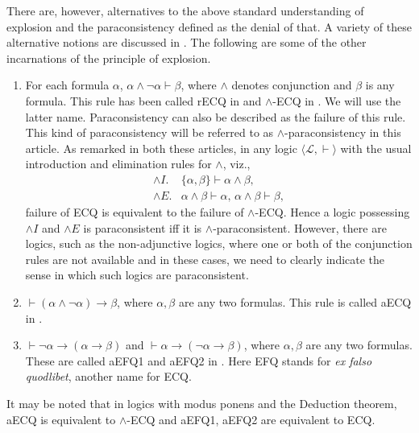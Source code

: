 \documentclass[submission]{eptcs}
\newcommand{\lang}{\mathcal{L}}
\newcommand{\limp}{\longrightarrow}
\theoremstyle{definition}
\begin{document}
There are, however, alternatives to the above standard understanding of explosion and the paraconsistency defined as the denial of that. A variety of these alternative notions are discussed in \cite{Robles2009}. The following are some of the other incarnations of the principle of explosion.
\begin{enumerate}
    \item For each formula $\alpha$, $\alpha\land\neg\alpha\vdash\beta$, where $\land$ denotes conjunction and $\beta$ is any formula. This rule has been called rECQ in \cite{Robles2009} and $\land$-ECQ in \cite{BasuChakraborty2021}. We will use the latter name. Paraconsistency can also be described as the failure of this rule. This kind of paraconsistency will be referred to as $\land$-paraconsistency in this article. As remarked in both these articles, in any logic $\langle\lang,\vdash\rangle$ with the usual introduction and elimination rules for $\land$, viz.,
\[
\begin{array}{ll}
     \land I.&\{\alpha,\beta\}\vdash\alpha\land\beta,\\
     \land E.&\alpha\land\beta\vdash\alpha,\,\alpha\land\beta\vdash\beta,
\end{array}
\]
failure of ECQ is equivalent to the failure of $\land$-ECQ. Hence a logic possessing $\land I$ and $\land E$ is paraconsistent iff it is $\land$-paraconsistent. However, there are logics, such as the non-adjunctive logics, where one or both of the conjunction rules are not available and in these cases, we need to clearly indicate the sense in which such logics are paraconsistent. 
\item $\vdash(\alpha\land\neg\alpha)\limp\beta$, where $\alpha,\beta$ are any two formulas. This rule is called aECQ in \cite{Robles2009}.
\item $\vdash\neg\alpha\limp(\alpha\limp\beta)$ and $\vdash\alpha\limp(\neg\alpha\limp\beta)$, where $\alpha,\beta$ are any two formulas. These are called aEFQ1 and aEFQ2 in \cite{Robles2009}. Here EFQ stands for \emph{ex falso quodlibet}, another name for ECQ.
\end{enumerate}
It may be noted that in logics with modus ponens and the Deduction theorem, aECQ is equivalent to $\land$-ECQ and aEFQ1, aEFQ2 are equivalent to ECQ.
\end{document}
